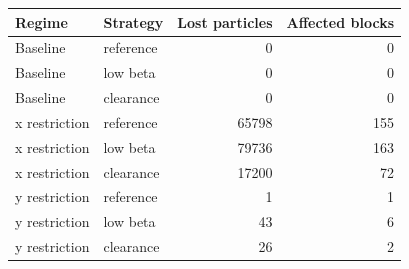 \begin{tabular}{llrr}\toprule
Regime & Strategy & Lost particles & Affected blocks \\\midrule
Baseline & reference & 0 & 0 \\
Baseline & low beta & 0 & 0 \\
Baseline & clearance & 0 & 0 \\
x restriction & reference & 65798 & 155 \\
x restriction & low beta & 79736 & 163 \\
x restriction & clearance & 17200 & 72 \\
y restriction & reference & 1 & 1 \\
y restriction & low beta & 43 & 6 \\
y restriction & clearance & 26 & 2 \\
\bottomrule\end{tabular}
